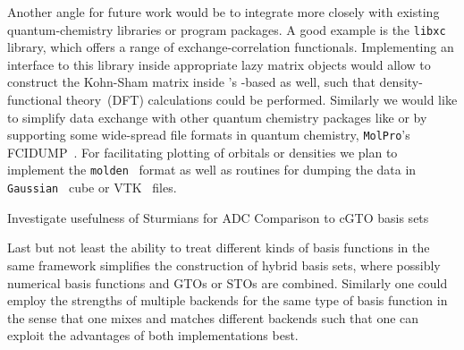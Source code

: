 Another angle for future work would be to integrate more closely
with existing quantum-chemistry libraries or program packages.
A good example is the \texttt{libxc}~\cite{Lehtola2018} library,
which offers a range of exchange-correlation functionals.
Implementing an interface to this library inside appropriate
lazy matrix objects would allow to construct the Kohn-Sham matrix
inside \molsturm's \contraction-based \SCF as well,
such that density-functional theory~(DFT) calculations
could be performed.
Similarly we would like to simplify
data exchange with other quantum chemistry packages like \pyscf or \psifour
by supporting some wide-spread file formats in quantum chemistry,
\eg \texttt{MolPro}'s FCIDUMP~\cite{Knowles1989}.
For facilitating plotting of \SCF orbitals or densities
we plan to implement the \texttt{molden}~\cite{Schaftenaar2000} format
as well as routines for dumping the data
in \texttt{Gaussian}~\cite{Frisch2016} cube or VTK~\cite{Avila2010} files.

%
%
Investigate usefulness of Sturmians for ADC
Comparison to cGTO basis sets


%
%
Last but not least the ability to treat different kinds of basis functions
in the same framework simplifies the construction of hybrid basis sets,
where possibly numerical basis functions and GTOs or STOs are combined.
Similarly one could employ the strengths of multiple backends for the same type of basis function
in the sense that one mixes and matches different backends such that one can exploit
the advantages of both implementations best.
